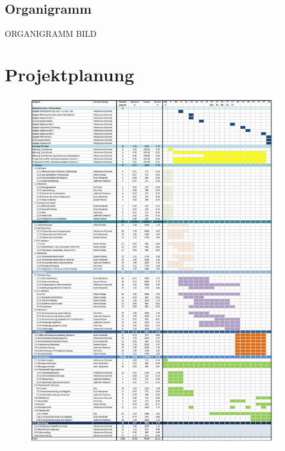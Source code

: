 \documentclass[10pt,a4paper,oneside]{99_fhnwreport}
\begin{document}
\subsection{Organigramm}\label{subsec:organigramm}
ORGANIGRAMM BILD

\newpage

\section{Projektplanung}\label{sec:projektplanung}
\begin{figure}[htbp]
	\centering
	\includegraphics[width=13.5cm]{projektplan.png}
\end{figure}
\newpage
\end{document}
